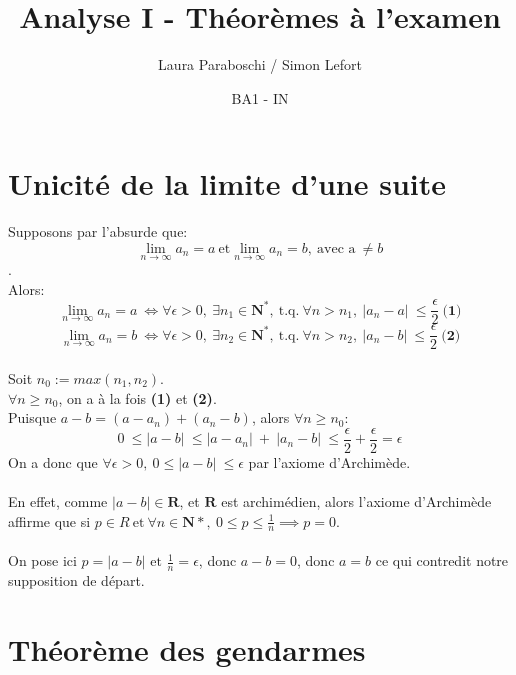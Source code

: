\documentclass{article}
\title{Analyse I - Théorèmes à l'examen}
\author{Laura Paraboschi / Simon Lefort }
\date{BA1 - IN}
\begin{document}
\maketitle

\section{Unicité de la limite d'une suite}

Supposons par l'absurde que:
\[ \lim_{n\to\infty}a_n = a\ \text{et} \lim_{n\to\infty}a_n = b,\ \text{avec a}\ \neq b \].\\
Alors:
\[ \lim_{n\to\infty}a_n = a\ \Leftrightarrow \forall \epsilon > 0,\ \exists n_1 \in \mathbf{N^*},\ \text{t.q.}\ \forall n > n_1,\ \lvert a_n - a \lvert\ \leq \frac{\epsilon}{2}\ \textbf{(1)}\]
\[ \lim_{n\to\infty}a_n = b\ \Leftrightarrow \forall \epsilon > 0,\ \exists n_2 \in \mathbf{N^*},\ \text{t.q.}\ \forall n > n_2,\ \lvert a_n - b \lvert\ \leq \frac{\epsilon}{2}\ \textbf{(2)}\]\\
Soit $ n_0 := max(n_1, n_2) $.\\
$ \forall n \geq n_0 $, on a à la fois \textbf{(1)} et \textbf{(2)}.\\
Puisque $ a - b = (a - a_n) + (a_n - b) $, alors $ \forall n \geq n_0 $:\\
\[ 0\ \leq \lvert a - b \lvert\ \leq \lvert a - a_n \lvert\ +\ \lvert a_n - b \lvert\ \leq \frac{\epsilon}{2} + \frac{\epsilon}{2} = \epsilon \]
On a donc que $ \forall \epsilon > 0,\ 0 \leq \lvert a - b \lvert\ \leq \epsilon $ par l'axiome d'Archimède.\\\\
En effet, comme $ |a-b| \in \mathbf{R} $, et $ \mathbf{R} $ est archimédien, alors l'axiome d'Archimède affirme que si $ p \in R\ \text{et}\ \forall n \in \mathbf{N*},\ 0 \leq p \leq \frac{1}{n} \implies p = 0 $. \\\\
On pose ici $ p = |a - b| \text{ et } \frac{1}{n} = \epsilon $, donc $ a - b = 0 $, donc $ a = b $ ce qui contredit notre supposition de départ.

\newpage

\section{Théorème des gendarmes}
\end{document}
